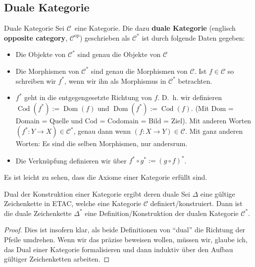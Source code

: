 \documentclass[a4paper]{amsart}
\theoremstyle{definition}
\DeclareMathOperator{\Dom}{Dom}
\DeclareMathOperator{\Cod}{Cod}
\newcommand{\CC}{\ensuremath{\mathcal{ C }}}
\begin{document}
\subsection{Duale Kategorie}
\begin{Definition}{Duale Kategorie}
   Sei \CC\ eine Kategorie. Die dazu \textbf{duale Kategorie} (englisch \textbf{opposite category}, $\CC^\text{op}$) geschrieben als $\CC^*$ ist durch folgende Daten gegeben:
   \begin{itemize}
      \item Die Objekte von $\CC^*$ sind genau die Objekte von $\CC$
      \item Die Morphismen von $\CC^*$ sind genau die Morphismen von $\CC$. Ist $f \in \CC$ so schreiben wir $f^*$, wenn wir ihn als Morphismus in $\CC^*$ betrachten.
      \item $f^*$ geht in die entgegengesetzte Richtung von $f$. D.~h. wir definieren $\Cod(f^*) := \Dom(f)$ und $\Dom(f^*) := \Cod(f)$. (Mit Dom = Domain = Quelle und Cod = Codomain = Bild = Ziel). Mit anderen Worten $(f^* \colon Y \to X) \in \CC^*$, genau dann wenn $(f \colon X \to Y) \in \CC$. Mit ganz anderen Worten: Es sind die selben Morphismen, nur andersrum.
      \item Die Verknüpfung definieren wir über $f^* \circ g^* := (g \circ f)^*$.
   \end{itemize}
\end{Definition}
Es ist leicht zu sehen, dass die Axiome einer Kategorie erfüllt sind.

\begin{Satz}{Dual der Konstruktion einer Kategorie ergibt deren duale}
   Sei $\Delta$ eine gültige Zeichenkette in ETAC, welche eine Kategorie $\CC$ definiert/konstruiert. Dann ist die duale Zeichenkette $\Delta^*$ eine Definition/Konstruktion der dualen Kategorie $\CC^*$.
\end{Satz}
\begin{proof}
   Dies ist insofern klar, als beide Definitionen von "`dual"' die Richtung der Pfeile umdrehen. Wenn wir das präzise beweisen wollen, müssen wir, glaube ich, das Dual einer Kategorie formalisieren und dann induktiv über den Aufbau gültiger Zeichenketten arbeiten.
\end{proof}
\end{document}
